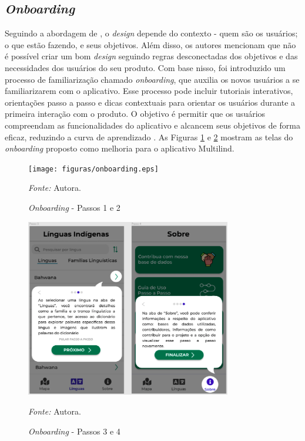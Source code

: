 \subsection{\textit{Onboarding}}
\label{sec:Onboarding}
Seguindo a abordagem de , o \textit{design} depende do contexto - quem são os usuários; o que estão fazendo, e seus objetivos. Além disso, os autores mencionam que não é possível 
criar um bom \textit{design} seguindo regras desconectadas dos objetivos e das necessidades dos usuários do seu produto. Com base nisso, foi introduzido um processo de familiarização chamado \textit{onboarding}, que 
auxilia os novos usuários a se familiarizarem com o aplicativo. Esse processo pode incluir tutoriais interativos, orientações passo a passo e dicas contextuais para orientar os usuários durante a primeira interação com 
o produto. O objetivo é permitir que os usuários compreendam as funcionalidades do aplicativo e alcancem seus objetivos de forma eficaz, reduzindo a curva de aprendizado \cite{renz2014}. As Figuras \ref{fig22} e \ref{fig23} mostram as 
telas do \textit{onboarding} proposto como melhoria para o aplicativo Multilind.

\begin{figure}[h!]
	\centering
	\caption{\textit{Onboarding} - Passos 1 e 2}
	\begin{adjustbox}{center}
		\texttt{[image: figuras/onboarding.eps]}
	\end{adjustbox}
	\begin{tablenotes}[flushleft]
		\centering
		\item \textit{Fonte:} Autora.
	\end{tablenotes}
	\label{fig22}
\end{figure}

\begin{figure}[h!]
	\centering
	\caption{\textit{Onboarding} - Passos 3 e 4}
	\begin{adjustbox}{center}
		\includegraphics[width=0.8\textwidth]{figuras/onboarding1.eps}
	\end{adjustbox}
	\begin{tablenotes}[flushleft]
		\centering
		\item \textit{Fonte:} Autora.
	\end{tablenotes}
	\label{fig23}
\end{figure}

